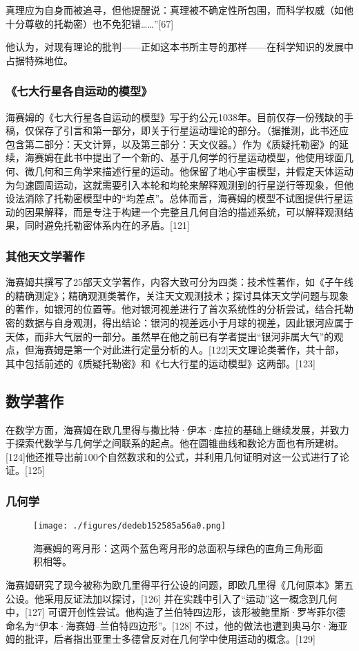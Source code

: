 真理应为自身而被追寻，但他提醒说：真理被不确定性所包围，而科学权威（如他十分尊敬的托勒密）也不免犯错……”[67]

他认为，对现有理论的批判——正如这本书所主导的那样——在科学知识的发展中占据特殊地位。
\subsubsection{《七大行星各自运动的模型》}
海赛姆的《七大行星各自运动的模型》写于约公元1038年。目前仅存一份残缺的手稿，仅保存了引言和第一部分，即关于行星运动理论的部分。（据推测，此书还应包含第二部分：天文计算，以及第三部分：天文仪器。）作为《质疑托勒密》的延续，海赛姆在此书中提出了一个新的、基于几何学的行星运动模型，他使用球面几何、微几何和三角学来描述行星的运动。他保留了地心宇宙模型，并假定天体运动为匀速圆周运动，这就需要引入本轮和均轮来解释观测到的行星逆行等现象，但他设法消除了托勒密模型中的“均差点”。总体而言，海赛姆的模型不试图提供行星运动的因果解释，而是专注于构建一个完整且几何自洽的描述系统，可以解释观测结果，同时避免托勒密体系内在的矛盾。[121]
\subsubsection{其他天文学著作}
海赛姆共撰写了25部天文学著作，内容大致可分为四类：技术性著作，如《子午线的精确测定》；精确观测类著作，关注天文观测技术；探讨具体天文学问题与现象的著作，如银河的位置等。他对银河视差进行了首次系统性的分析尝试，结合托勒密的数据与自身观测，得出结论：银河的视差远小于月球的视差，因此银河应属于天体，而非大气层的一部分。虽然早在他之前已有学者提出“银河非属大气”的观点，但海赛姆是第一个对此进行定量分析的人。[122]天文理论类著作，共十部，其中包括前述的《质疑托勒密》和《七大行星的运动模型》这两部。[123]
\subsection{数学著作}
在数学方面，海赛姆在欧几里得与撒比特·伊本·库拉的基础上继续发展，并致力于探索代数学与几何学之间联系的起点。他在圆锥曲线和数论方面也有所建树。[124]他还推导出前100个自然数求和的公式，并利用几何证明对这一公式进行了论证。[125]
\subsubsection{几何学}
\begin{figure}[ht]
\centering
\texttt{[image: ./figures/dedeb152585a56a0.png]}
\caption{海赛姆的弯月形：这两个蓝色弯月形的总面积与绿色的直角三角形面积相等。} \label{fig_YBH_4}
\end{figure}
海赛姆研究了现今被称为欧几里得平行公设的问题，即欧几里得《几何原本》第五公设。他采用反证法加以探讨，[126] 并在实践中引入了“运动”这一概念到几何中，[127] 可谓开创性尝试。他构造了兰伯特四边形，该形被鲍里斯·罗岑菲尔德命名为“伊本·海赛姆–兰伯特四边形”。[128]
不过，他的做法也遭到奥马尔·海亚姆的批评，后者指出亚里士多德曾反对在几何学中使用运动的概念。[129]

